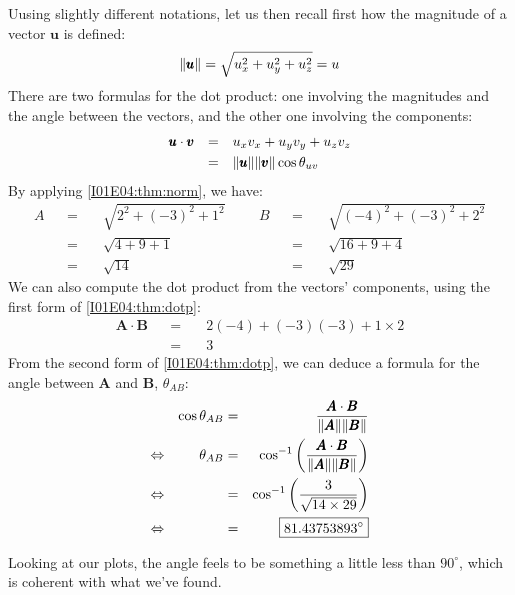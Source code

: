 \documentclass[solutions.tex]{subfiles}
\begin{document}
Uusing slightly different notations, let us then recall first
how the magnitude of a vector $\bm{u}$ is defined:
\begin{equation}
	\lVert \pmb{u} \rVert = \sqrt{u_x^2 + u_y^2 + u_z^2} = u
	\label{I01E04:thm:norm}
\end{equation}
There are two formulas for the dot product: one involving
the magnitudes and the angle between the vectors, and the
other one involving the components:
\begin{equation} \begin{aligned}
	\pmb{u}\cdot\pmb{v} &&=\quad& u_xv_x + u_yv_y + u_zv_z \\
	~ &&=\quad& \lVert \pmb{u} \rVert\lVert \pmb{v} \rVert\cos\theta_{uv}
	\label{I01E04:thm:dotp}
\end{aligned} \end{equation}
By applying \eqref{I01E04:thm:norm}, we have:
\begin{equation*} \begin{aligned}
	A &&=\quad& \sqrt{2^2+(-3)^2+1^2} &&& B &&=\quad& \sqrt{(-4)^2+(-3)^2+2^2} \\
	~ &&=\quad& \sqrt{4+9+1} &&& ~ &&=\quad& \sqrt{16+9+4} \\
	~ &&=\quad& \boxed{\sqrt{14}} &&& ~ &&=\quad& \boxed{\sqrt{29}}
\end{aligned} \end{equation*}
We can also compute the dot product from the vectors' components,
using the first form of \eqref{I01E04:thm:dotp}:
\begin{equation*} \begin{aligned}
	\bm{A} \cdot \bm{B} &&=\quad& 2(-4) + (-3)(-3) + 1\times 2 \\
	~ &&=\quad& \boxed{3}
\end{aligned} \end{equation*}
From the second form of \eqref{I01E04:thm:dotp}, we can deduce
a formula for the angle between $\bm{A}$ and $\bm{B}$, $\theta_{AB}$:
\begin{equation*} \begin{aligned}
	~ && \cos\theta_{AB} &=& \frac{\pmb{A}\cdot\pmb{B}}{\lVert \pmb{A} \rVert\lVert \pmb{B} \rVert} \\
	\Leftrightarrow && \theta_{AB} &=& \cos^{-1}\left(
		\frac{\pmb{A}\cdot\pmb{B}}{\lVert \pmb{A} \rVert\lVert \pmb{B} \rVert}\right) \\
	\Leftrightarrow && ~ &=& \cos^{-1}\left(\frac{3}{\sqrt{14\times 29}}\right) \\
	\Leftrightarrow && ~ &=& \boxed{81.43753893^\circ}
\end{aligned} \end{equation*}
\begin{remark} Looking at our plots, the angle feels to be something a little less
than $90^\circ$, which is coherent with what we've found.
\end{remark}
\end{document}

